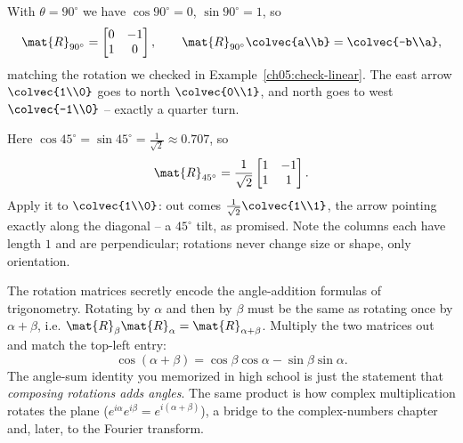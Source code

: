 \begin{example}
\label{ch05:rot90}
With $\theta = 90^\circ$ we have $\cos 90^\circ = 0$, $\sin 90^\circ = 1$, so
\[
  \mat{R}_{90^\circ} = \begin{bmatrix} 0 & -1 \\ 1 & 0 \end{bmatrix},
  \qquad
  \mat{R}_{90^\circ}\colvec{a\\b} = \colvec{-b\\a},
\]
matching the rotation we checked in Example~\ref{ch05:check-linear}. The east
arrow $\colvec{1\\0}$ goes to north $\colvec{0\\1}$, and north goes to west
$\colvec{-1\\0}$ -- exactly a quarter turn.
\end{example}

\begin{example}
\label{ch05:rot45}
Here $\cos 45^\circ = \sin 45^\circ = \tfrac{1}{\sqrt 2} \approx 0.707$, so
\[
  \mat{R}_{45^\circ} = \frac{1}{\sqrt 2}\begin{bmatrix} 1 & -1 \\ 1 & 1\end{bmatrix}.
\]
Apply it to $\colvec{1\\0}$: out comes $\tfrac{1}{\sqrt2}\colvec{1\\1}$, the
arrow pointing exactly along the diagonal -- a $45^\circ$ tilt, as promised. Note
the columns each have length $1$ and are perpendicular; rotations never change
size or shape, only orientation.
\end{example}

\begin{connectionbox}
The rotation matrices secretly encode the angle-addition formulas of
trigonometry. Rotating by $\alpha$ and then by $\beta$ must be the same as
rotating once by $\alpha + \beta$, i.e. $\mat{R}_\beta \mat{R}_\alpha =
\mat{R}_{\alpha+\beta}$. Multiply the two matrices out and match the top-left
entry:
\[
  \cos(\alpha+\beta) = \cos\beta\cos\alpha - \sin\beta\sin\alpha.
\]
The angle-sum identity you memorized in high school is just the statement that
\emph{composing rotations adds angles}. The same product is how complex
multiplication rotates the plane ($e^{i\alpha} e^{i\beta} = e^{i(\alpha+\beta)}$),
a bridge to the complex-numbers chapter and, later, to the Fourier transform.
\end{connectionbox}

